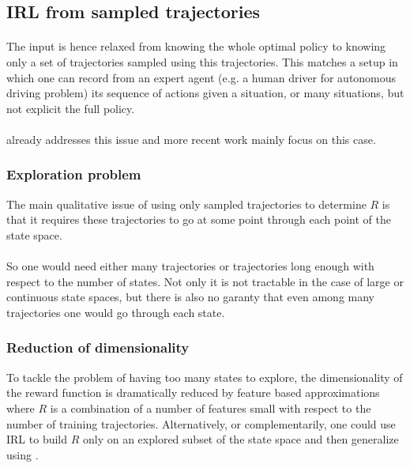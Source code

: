 \documentclass{article}
\begin{document}
\subsection{IRL from sampled trajectories}

\paragraph{}
The input is hence relaxed from knowing the whole optimal policy to knowing only a set of trajectories sampled using this trajectories. This matches a setup in which one can record from an expert agent (e.g. a human driver for autonomous driving problem) its sequence of actions given a situation, or many situations, but not explicit the full policy.

\paragraph{}
\cite{Ng00} already addresses this issue and more recent work mainly focus on this case.

\subsubsection{Exploration problem}
The main qualitative issue of using only sampled trajectories to determine $R$ is that it requires these trajectories to go at some point through each point of the state space.

\paragraph{}
So one would need either many trajectories or trajectories long enough with respect to the number of states. Not only it is not tractable in the case of large or continuous state spaces, but there is also no garanty that even among many trajectories one would go through each state.

\subsubsection{Reduction of dimensionality}
To tackle the problem of having too many states to explore, the dimensionality of the reward function is dramatically reduced by feature based approximations \cite{Abbeel04, Levine11} where $R$ is a combination of a number of features small with respect to the number of training trajectories. Alternatively, or complementarily, one could use IRL to build $R$ only on an explored subset of the state space and then generalize using \cite{Finn17}.
\end{document}
